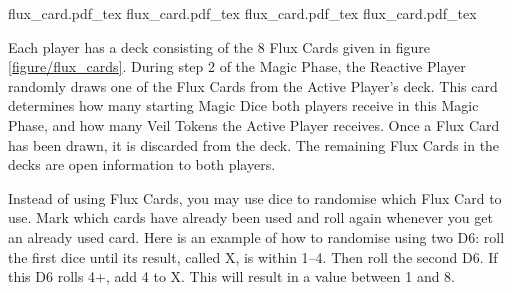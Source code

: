 \begin{figure*}[!t]
	\def\FluxCardTitle{\Largefontsize\textbf{Flux Card 5}}
	\def\FluxCardDice{%
	\textbf{5 Magic Dice}\par
	(both players)}
	\def\FluxCardVeil{\textbf{9 Veil Tokens}\par
	(Active Player)}
	\def\FluxCardMiscast{}
	\def\svgwidth{\fluxcardwidth}
	{flux_card.pdf_tex}
	\hspace{\fluxcardgap}
	\def\FluxCardTitle{\Largefontsize\textbf{Flux Card 6}}
	\def\FluxCardDice{%
	\textbf{6 Magic Dice}\par
	(both players)}
	\def\FluxCardVeil{\textbf{5 Veil Tokens}\par
	(Active Player)}
	\def\FluxCardMiscast{}
	\def\svgwidth{\fluxcardwidth}
	{flux_card.pdf_tex}
	\hspace{\fluxcardgap}
	\def\FluxCardTitle{\Largefontsize\textbf{Flux Card 7}}
	\def\FluxCardDice{%
	\textbf{6 Magic Dice}\par
	(both players)}
	\def\FluxCardVeil{\textbf{7 Veil Tokens}\par
	(Active Player)}
	\def\FluxCardMiscast{}
	\def\svgwidth{\fluxcardwidth}
	{flux_card.pdf_tex}
	\hspace{\fluxcardgap}
	\def\FluxCardTitle{\Largefontsize\textbf{Flux Card 8}}
	\def\FluxCardDice{%
	\textbf{7 Magic Dice}\par
	(both players)}
	\def\FluxCardVeil{\textbf{7 Veil Tokens}\par
	(Active Player)}
	\def\FluxCardMiscast{\normalfontsize All Miscasts this phase suffer a \textbf{−1} Miscast Modifier}
	\def\svgwidth{\fluxcardwidth}
	{flux_card.pdf_tex}
	
	\caption{Flux Cards.}
	\label{figure/flux_cards}
\end{figure*}

Each player has a deck consisting of the 8 Flux Cards given in figure \ref{figure/flux_cards}. During step 2 of the Magic Phase, the Reactive Player randomly draws one of the Flux Cards from the Active Player's deck. This card determines how many starting Magic Dice both players receive in this Magic Phase, and how many Veil Tokens the Active Player receives. Once a Flux Card has been drawn, it is discarded from the deck. The remaining Flux Cards in the decks are open information to both players.

Instead of using Flux Cards, you may use dice to randomise which Flux Card to use. Mark which cards have already been used and roll again whenever you get an already used card. Here is an example of how to randomise using two D6: roll the first dice until its result, called X, is within 1--4. Then roll the second D6. If this D6 rolls 4+, add 4 to X. This will result in a value between 1 and 8.

